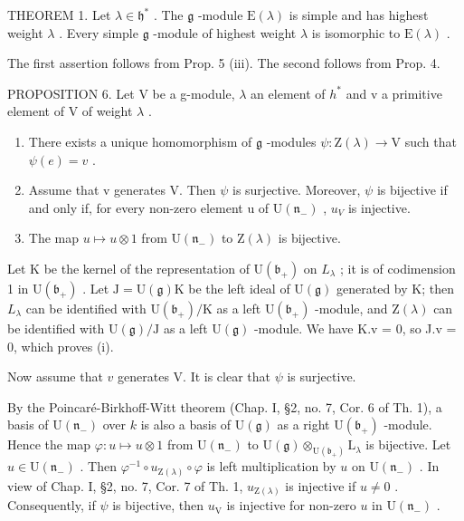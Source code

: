 THEOREM 1. Let \(\lambda \in \mathfrak{h}^*\) . The \(\mathfrak{g}\) -module \(\mathrm{E}(\lambda)\) is simple and has highest weight \(\lambda\) . Every simple \(\mathfrak{g}\) -module of highest weight \(\lambda\) is isomorphic to \(\mathrm{E}(\lambda)\) .

The first assertion follows from Prop. 5 (iii). The second follows from Prop. 4.

PROPOSITION 6. Let V be a g-module, \(\lambda\) an element of \(h^{*}\) and v a primitive element of V of weight \(\lambda\) .

\begin{enumerate}
\def\labelenumi{(\roman{enumi})}
\item
  There exists a unique homomorphism of \(\mathfrak{g}\) -modules \(\psi: \mathrm{Z}(\lambda) \to \mathrm{V}\) such that \(\psi(e) = v\) .
\item
  Assume that v generates V. Then \(\psi\) is surjective. Moreover, \(\psi\) is bijective if and only if, for every non-zero element u of \(\mathrm{U}(\mathfrak{n}_{-})\) , \(u_{V}\) is injective.
\item
  The map \(u \mapsto u \otimes 1\) from \(\mathrm{U}(\mathfrak{n}_{-})\) to \(\mathrm{Z}(\lambda)\) is bijective.
\end{enumerate}

Let K be the kernel of the representation of \(\mathrm{U}(\mathfrak{b}_{+})\) on \(L_{\lambda}\) ; it is of codimension 1 in \(\mathrm{U}(\mathfrak{b}_{+})\) . Let \(\mathrm{J} = \mathrm{U}(\mathfrak{g})\mathrm{K}\) be the left ideal of \(\mathrm{U}(\mathfrak{g})\) generated by K; then \(L_{\lambda}\) can be identified with \(\mathrm{U}(\mathfrak{b}_{+})/\mathrm{K}\) as a left \(\mathrm{U}(\mathfrak{b}_{+})\) -module, and \(\mathrm{Z}(\lambda)\) can be identified with \(\mathrm{U}(\mathfrak{g})/\mathrm{J}\) as a left \(\mathrm{U}(\mathfrak{g})\) -module. We have K.v = 0, so J.v = 0, which proves (i).

Now assume that \(v\) generates V. It is clear that \(\psi\) is surjective.

By the Poincaré-Birkhoff-Witt theorem (Chap. I, §2, no. 7, Cor. 6 of Th. 1), a basis of \(\mathrm{U}(\mathfrak{n}_{-})\) over \(k\) is also a basis of \(\mathrm{U}(\mathfrak{g})\) as a right \(\mathrm{U}(\mathfrak{b}_{+})\) -module. Hence the map \(\varphi : u \mapsto u \otimes 1\) from \(\mathrm{U}(\mathfrak{n}_{-})\) to \(\mathrm{U}(\mathfrak{g}) \otimes_{\mathrm{U}(\mathfrak{b}_{+})} \mathrm{L}_{\lambda}\) is bijective. Let \(u \in \mathrm{U}(\mathfrak{n}_{-})\) . Then \(\varphi^{-1} \circ u_{\mathrm{Z}(\lambda)} \circ \varphi\) is left multiplication by \(u\) on \(\mathrm{U}(\mathfrak{n}_{-})\) . In view of Chap. I, §2, no. 7, Cor. 7 of Th. 1, \(u_{\mathrm{Z}(\lambda)}\) is injective if \(u \neq 0\) . Consequently, if \(\psi\) is bijective, then \(u_{\mathrm{V}}\) is injective for non-zero \(u\) in \(\mathrm{U}(\mathfrak{n}_{-})\) .

